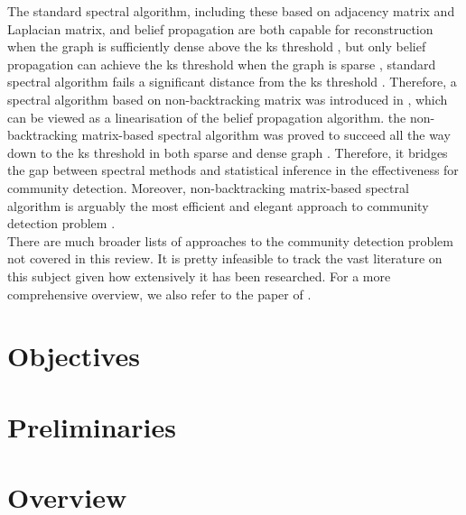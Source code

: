 The standard spectral algorithm, including these based on adjacency matrix and Laplacian matrix, and belief propagation are both capable for reconstruction when the graph is sufficiently dense above the ks threshold \cite{standard_spec_in_dense}, but only belief propagation can achieve the ks threshold when the graph is sparse \cite{firstpaper}, standard spectral algorithm fails a significant distance from the ks threshold \cite{standard_spec_fail}. Therefore, a spectral algorithm based on non-backtracking matrix was introduced in \cite{the_non_backtracking}, which can be viewed as a linearisation of the belief propagation algorithm\cite{as15c}. the non-backtracking matrix-based spectral algorithm was proved to succeed all the way down to the ks threshold in both sparse and dense graph \cite{blm15}. Therefore, it bridges the gap between spectral methods and statistical inference in the effectiveness for community detection. Moreover, non-backtracking matrix-based spectral algorithm is arguably the most efficient and elegant approach to community detection problem \cite{the_non_backtracking} \cite{TheConjecture}.\\
There are much broader lists of approaches to the community detection problem not covered in this review. It is pretty infeasible to track the vast literature on this subject given how extensively it has been researched. For a more comprehensive overview, we also refer to the paper of \cite{TheConjecture} \cite{comm_dete_in_graphs} \cite{userguide}.
\section{Objectives}
\section{Preliminaries}
\section{Overview}

